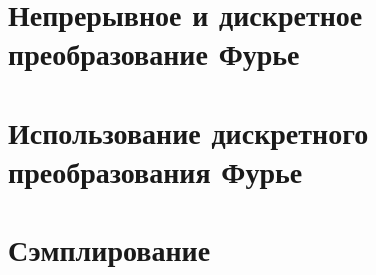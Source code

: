 \section{Непрерывное и дискретное преобразование Фурье}


\FloatBarrier
\section{Использование дискретного преобразования Фурье}


\FloatBarrier
\section{Сэмплирование}

